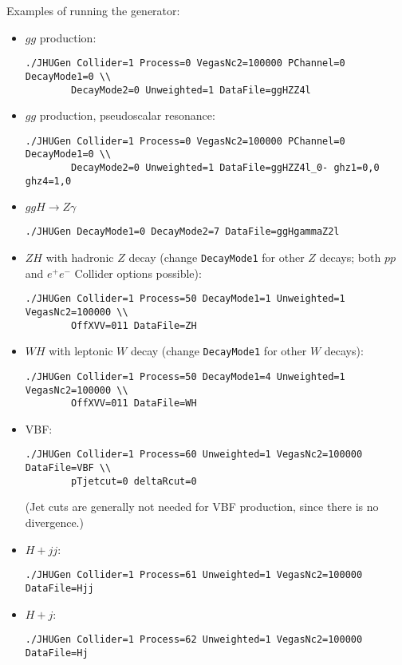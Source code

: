 \documentclass[aps,superscriptaddress,nofootinbib]{revtex4}
\begin{document}
Examples of running the generator:
\begin{itemize}
\item $gg$ production:
\begin{verbatim}
./JHUGen Collider=1 Process=0 VegasNc2=100000 PChannel=0 DecayMode1=0 \\
		DecayMode2=0 Unweighted=1 DataFile=ggHZZ4l
\end{verbatim}
\item $gg$ production, pseudoscalar resonance:
\begin{verbatim}
./JHUGen Collider=1 Process=0 VegasNc2=100000 PChannel=0 DecayMode1=0 \\
		DecayMode2=0 Unweighted=1 DataFile=ggHZZ4l_0- ghz1=0,0 ghz4=1,0
\end{verbatim}
\item $ggH \to Z\gamma$
\begin{verbatim}
./JHUGen DecayMode1=0 DecayMode2=7 DataFile=ggHgammaZ2l
\end{verbatim}
\item $ZH$ with hadronic $Z$ decay (change \verb|DecayMode1| for other $Z$ decays; both $pp$ and $e^+e^-$ Collider options possible):
\begin{verbatim}
./JHUGen Collider=1 Process=50 DecayMode1=1 Unweighted=1 VegasNc2=100000 \\
		OffXVV=011 DataFile=ZH
\end{verbatim}
\item $WH$ with leptonic $W$ decay (change \verb|DecayMode1| for other $W$ decays):
\begin{verbatim}
./JHUGen Collider=1 Process=50 DecayMode1=4 Unweighted=1 VegasNc2=100000 \\
		OffXVV=011 DataFile=WH
\end{verbatim}
\item VBF:
\begin{verbatim}
./JHUGen Collider=1 Process=60 Unweighted=1 VegasNc2=100000 DataFile=VBF \\
		pTjetcut=0 deltaRcut=0
\end{verbatim}
(Jet cuts are generally not needed for VBF production, since there is no divergence.)
\item $H+jj$:
\begin{verbatim}
./JHUGen Collider=1 Process=61 Unweighted=1 VegasNc2=100000 DataFile=Hjj
\end{verbatim}
\item $H+j$:
\begin{verbatim}
./JHUGen Collider=1 Process=62 Unweighted=1 VegasNc2=100000 DataFile=Hj

\end{verbatim}
\end{itemize}
\end{document}
